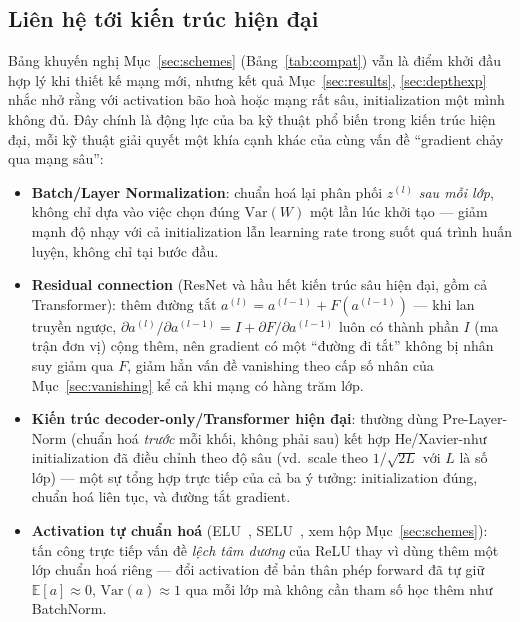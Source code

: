 \documentclass[12pt,a4paper]{report}
\begin{document}
\subsection{Liên hệ tới kiến trúc hiện đại}

Bảng khuyến nghị Mục~\ref{sec:schemes} (Bảng~\ref{tab:compat}) vẫn là
điểm khởi đầu hợp lý khi thiết kế mạng mới, nhưng kết quả
Mục~\ref{sec:results}, \ref{sec:depthexp} nhắc nhở rằng với activation
bão hoà hoặc mạng rất sâu, initialization một mình không đủ. Đây chính là
động lực của ba kỹ thuật phổ biến trong kiến trúc hiện đại, mỗi kỹ thuật
giải quyết một khía cạnh khác của cùng vấn đề ``gradient chảy qua mạng
sâu'':

\begin{itemize}
\item \textbf{Batch/Layer Normalization}: chuẩn hoá lại phân phối
  $z^{(l)}$ \emph{sau mỗi lớp}, không chỉ dựa vào việc chọn đúng
  $\mathrm{Var}(W)$ một lần lúc khởi tạo --- giảm mạnh độ nhạy với cả
  initialization lẫn learning rate trong suốt quá trình huấn luyện, không
  chỉ tại bước đầu.
\item \textbf{Residual connection} (ResNet và hầu hết kiến trúc sâu hiện
  đại, gồm cả Transformer): thêm đường tắt $a^{(l)}=a^{(l-1)}+F(a^{(l-1)})$
  --- khi lan truyền ngược, $\partial a^{(l)}/\partial a^{(l-1)} = I + \partial F/\partial a^{(l-1)}$
  luôn có thành phần $I$ (ma trận đơn vị) cộng thêm, nên gradient có một
  ``đường đi tắt'' không bị nhân suy giảm qua $F$, giảm hẳn vấn đề vanishing
  theo cấp số nhân của Mục~\ref{sec:vanishing} kể cả khi mạng có hàng trăm
  lớp.
\item \textbf{Kiến trúc decoder-only/Transformer hiện đại}: thường dùng
  Pre-Layer-Norm (chuẩn hoá \emph{trước} mỗi khối, không phải sau) kết
  hợp He/Xavier-như initialization đã điều chỉnh theo độ sâu (vd.\ scale
  theo $1/\sqrt{2L}$ với $L$ là số lớp) --- một sự tổng hợp trực tiếp của
  cả ba ý tưởng: initialization đúng, chuẩn hoá liên tục, và đường tắt
  gradient.
\item \textbf{Activation tự chuẩn hoá} (ELU~\citep{clevert2016elu},
  SELU~\citep{klambauer2017selu}, xem hộp Mục~\ref{sec:schemes}): tấn
  công trực tiếp vấn đề \emph{lệch tâm dương} của ReLU thay vì dùng thêm
  một lớp chuẩn hoá riêng --- đổi activation để bản thân phép forward đã
  tự giữ $\mathbb E[a]\approx0$, $\mathrm{Var}(a)\approx1$ qua mỗi lớp mà
  không cần tham số học thêm như BatchNorm.
\end{itemize}
\end{document}
